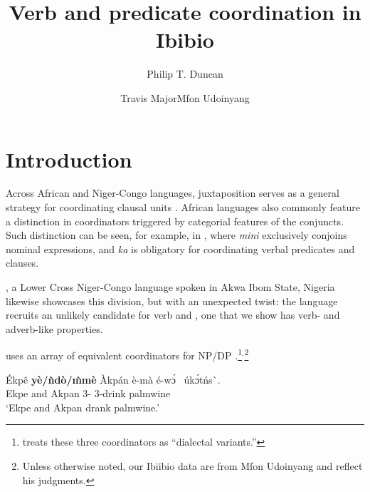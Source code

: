 \documentclass[output=paper]{../langsci/langscibook}
\author{Philip T. Duncan\affiliation{University of Kansas}\and Travis Major\affiliation{University of California, Los Angeles}\lastand Mfon Udoinyang\affiliation{University of Kansas}}
\title{Verb and predicate coordination in Ibibio}
\begin{document}
\section{Introduction}\label{sec:duncan-et-al:1} 
Across African and Niger-Congo languages, juxtaposition serves as a general strategy for coordinating clausal units \citep{zeller2015syntax,creissels2000typology,watters2000syntax}. African languages also commonly feature a distinction in coordinators triggered by categorial features of the conjuncts. Such distinction can be seen, for example, in , where \textit{mini} exclusively conjoins nominal expressions, and \textit{ka} is obligatory for coordinating verbal predicates and clauses. 


\noindent {}, a Lower Cross Niger-Congo language spoken in Akwa Ibom State, Nigeria likewise showcases this division, but with an unexpected twist: the language recruits an unlikely candidate for verb and , one that we show has verb- and adverb-like properties. 

 uses an array of equivalent coordinators for NP/DP .\footnote{\citet[147]{essien1990grammar} treats these three coordinators as ``dialectal variants.''}$^,$\footnote{Unless otherwise noted, our Ibiibio data are from Mfon Udoinyang and reflect his judgments.}

\ea\label{ex:duncan-et-al:2}
\gll \'{E}kp\^{e} \textbf{y\`{e}/\`{n}d\`{o}/\`{m}m\`{e}} \`{A}kp\'{a}n \`{e}-m\`{a} \'{e}-\ng w\'ɔ\ng~ \'{u}k\'ɔt\'{n}s\`{\textturnv}\ng. \\
Ekpe and Akpan 3{\pl}-{\pst} 3{\pl}-drink palmwine \\
\glt ‘Ekpe and Akpan drank palmwine.’
\z
\end{document}
